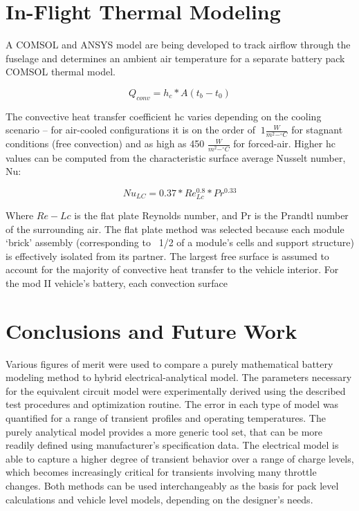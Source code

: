 \documentclass[]{aiaa-tc}%
\begin{document}
\section{In-Flight Thermal Modeling}


A COMSOL and ANSYS model are being developed to track airflow through the fuselage and determines an ambient air temperature for a separate battery pack COMSOL thermal model.

 \begin{equation}
Q_{conv} = h_{c}*A(t_{b}-t_{0})
\label{eq:Qconv}
\end{equation}


The convective heat transfer coefficient hc varies depending on the cooling scenario – for air-cooled configurations it is on the order of $~1 \frac{W}{m^{2} -^{\circ} C}$ for stagnant conditions (free convection) and as high as 450 $\frac{W}{m^{2} -^{\circ} C}$ for forced-air.  Higher hc values can be computed from the characteristic surface average Nusselt number, Nu: 
 
 \begin{equation}
Nu_{LC} = 0.37*Re_{Lc}^{0.8}*Pr^{0.33}
\label{eq:Nu}
\end{equation}


Where $Re-{Lc}$ is the flat plate Reynolds number, and Pr is the Prandtl number of the surrounding air. The flat plate method was selected because each module ‘brick’ assembly (corresponding to ~1/2 of a module’s cells and support structure) is effectively isolated from its partner. The largest free surface is assumed to account for the majority of convective heat transfer to the vehicle interior. For the mod II vehicle’s battery, each convection surface 


\section{Conclusions and Future Work}

Various figures of merit were used to compare a purely mathematical battery modeling method to hybrid electrical-analytical model. The parameters necessary for the equivalent circuit model were experimentally derived using the described test procedures and optimization routine. The error in each type of model was quantified for a range of transient profiles and operating temperatures. The purely analytical model provides a more generic tool set, that can be more readily defined using manufacturer's specification data. The electrical model is able to capture a higher degree of transient behavior over a range of charge levels, which becomes increasingly critical for transients involving many throttle changes. Both methods can be used interchangeably as the basis for pack level calculations and vehicle level models, depending on the designer's needs.
\end{document}
